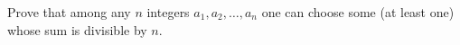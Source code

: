 Prove that among any $n$ integers $a_1,a_2,\dots,a_n$ one can choose some (at least one) whose sum is divisible by $n$.
